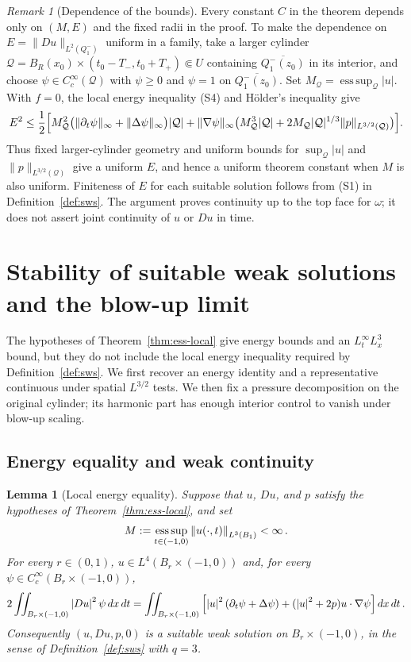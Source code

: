 \documentclass[11pt,letterpaper]{article}
\numberwithin{equation}{section}
\theoremstyle{plain}
\newtheorem{lemma}[theorem]{Lemma}
\theoremstyle{definition}
\theoremstyle{remark}
\newtheorem{remark}[theorem]{Remark}
\begin{document}
\begin{remark}[Dependence of the bounds]
Every constant $C$ in the theorem depends only on $(M,E)$ and the fixed radii in the proof. To make the dependence on $E=\|Du\|_{L^2(Q_1^-)}$ uniform in a family, take a larger cylinder $\mathcal Q=B_R(x_0)\times(t_0-T_-,t_0+T_+)\Subset U$ containing $\overline{Q_1^-(z_0)}$ in its interior, and choose $\psi\in C_c^\infty(\mathcal Q)$ with $\psi\ge0$ and $\psi=1$ on $\overline{Q_1^-(z_0)}$. Set $M_{\mathcal Q}=\operatorname*{ess\,sup}_{\mathcal Q}|u|$. With $f=0$, the local energy inequality (S4) and H\"older's inequality give
\[
 E^2\le\frac12\Bigl[M_{\mathcal Q}^2\bigl(\|\partial_t\psi\|_\infty+\|\Delta\psi\|_\infty\bigr)|\mathcal Q|
 +\|\nabla\psi\|_\infty\bigl(M_{\mathcal Q}^3|\mathcal Q|+2M_{\mathcal Q}|\mathcal Q|^{1/3}\|p\|_{L^{3/2}(\mathcal Q)}\bigr)\Bigr].
\]
Thus fixed larger-cylinder geometry and uniform bounds for $\sup_{\mathcal Q}|u|$ and $\|p\|_{L^{3/2}(\mathcal Q)}$ give a uniform $E$, and hence a uniform theorem constant when $M$ is also uniform. Finiteness of $E$ for each suitable solution follows from (S1) in Definition~\ref{def:sws}. The argument proves continuity up to the top face for $\omega$; it does not assert joint continuity of $u$ or $Du$ in time.
\end{remark}
\section{Stability of suitable weak solutions and the blow-up limit}\label{sec:blowup}

The hypotheses of Theorem~\ref{thm:ess-local} give energy bounds and an $L^\infty_tL^3_x$ bound, but they do not include the local energy inequality required by Definition~\ref{def:sws}. We first recover an energy identity and a representative continuous under spatial $L^{3/2}$ tests. We then fix a pressure decomposition on the original cylinder; its harmonic part has enough interior control to vanish under blow-up scaling.

\subsection{Energy equality and weak continuity}

\begin{lemma}[Local energy equality]\label{lem:lei-L4}
Suppose that $u$, $Du$, and $p$ satisfy the hypotheses of Theorem~\ref{thm:ess-local}, and set
\begin{equation}\label{eq:lei-L4-M}
M:=\operatorname*{ess\,sup}_{t\in(-1,0)}\left\lVert u(\cdot,t)\right\rVert_{L^3(B_1)}<\infty\,.
\end{equation}
For every $r\in(0,1)$, $u\in L^4(B_r\times(-1,0))$ and, for every $\psi\in C_c^\infty(B_r\times(-1,0))$,
\begin{equation}\label{eq:local-energy-equality}
2\iint_{B_r\times(-1,0)}\left\lvert Du\right\rvert^2\psi\,dx\,dt
=\iint_{B_r\times(-1,0)}\left[\left\lvert u\right\rvert^2(\partial_t\psi+\Delta\psi)
 +(\left\lvert u\right\rvert^2+2p)u\cdot\nabla\psi\right]dx\,dt\,.
\end{equation}
Consequently $(u,Du,p,0)$ is a suitable weak solution on $B_r\times(-1,0)$, in the sense of Definition~\ref{def:sws} with $q=3$.
\end{lemma}
\end{document}
